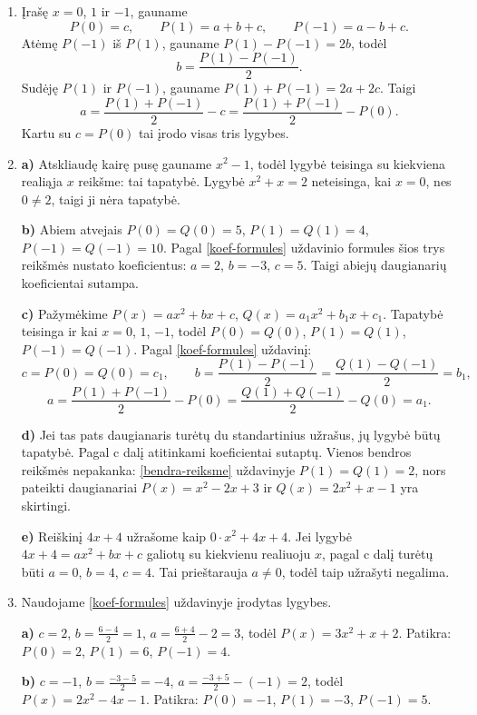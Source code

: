 \documentclass[12pt,a4paper]{exam}
\begin{document}
\begin{enumerate}
\textbf{b)} Įrašę $x=0$, gauname $P(0)=a\cdot0^2+b\cdot0+c=c$.

\textbf{c)} Kadangi $T(0)$ lygus laisvajam nariui, laisvasis narys yra $5$.

\textbf{d)} Pavyzdžiui, $x^2+5$ ir $2x^2+x+5$: jų laisvieji nariai lygūs $5$, o vyriausieji koeficientai nelygūs nuliui.
\item Įrašę $x=0$, $1$ ir $-1$, gauname
\[
P(0)=c,\qquad P(1)=a+b+c,\qquad P(-1)=a-b+c.
\]
Atėmę $P(-1)$ iš $P(1)$, gauname $P(1)-P(-1)=2b$, todėl
\[
b=\frac{P(1)-P(-1)}{2}.
\]
Sudėję $P(1)$ ir $P(-1)$, gauname $P(1)+P(-1)=2a+2c$. Taigi
\[
a=\frac{P(1)+P(-1)}{2}-c
 =\frac{P(1)+P(-1)}{2}-P(0).
\]
Kartu su $c=P(0)$ tai įrodo visas tris lygybes.
\item \textbf{a)} Atskliaudę kairę pusę gauname $x^2-1$, todėl lygybė teisinga su kiekviena realiąja $x$ reikšme: tai tapatybė. Lygybė $x^2+x=2$ neteisinga, kai $x=0$, nes $0\ne2$, taigi ji nėra tapatybė.

\textbf{b)} Abiem atvejais $P(0)=Q(0)=5$, $P(1)=Q(1)=4$, $P(-1)=Q(-1)=10$. Pagal \ref{koef-formules} uždavinio formules šios trys reikšmės nustato koeficientus: $a=2$, $b=-3$, $c=5$. Taigi abiejų daugianarių koeficientai sutampa.

\textbf{c)} Pažymėkime $P(x)=ax^2+bx+c$, $Q(x)=a_1x^2+b_1x+c_1$. Tapatybė teisinga ir kai $x=0$, $1$, $-1$, todėl $P(0)=Q(0)$, $P(1)=Q(1)$, $P(-1)=Q(-1)$. Pagal \ref{koef-formules} uždavinį:
\[c=P(0)=Q(0)=c_1,\qquad b=\frac{P(1)-P(-1)}{2}=\frac{Q(1)-Q(-1)}{2}=b_1,\]
\[a=\frac{P(1)+P(-1)}{2}-P(0)=\frac{Q(1)+Q(-1)}{2}-Q(0)=a_1.\]

\textbf{d)} Jei tas pats daugianaris turėtų du standartinius užrašus, jų lygybė būtų tapatybė. Pagal c dalį atitinkami koeficientai sutaptų. Vienos bendros reikšmės nepakanka: \ref{bendra-reiksme} uždavinyje $P(1)=Q(1)=2$, nors pateikti daugianariai $P(x)=x^2-2x+3$ ir $Q(x)=2x^2+x-1$ yra skirtingi.

\textbf{e)} Reiškinį $4x+4$ užrašome kaip $0\cdot x^2+4x+4$. Jei lygybė $4x+4=ax^2+bx+c$ galiotų su kiekvienu realiuoju $x$, pagal c dalį turėtų būti $a=0$, $b=4$, $c=4$. Tai prieštarauja $a\ne0$, todėl taip užrašyti negalima.
\item Naudojame \ref{koef-formules} uždavinyje įrodytas lygybes.

\textbf{a)} $c=2$, $b=\frac{6-4}{2}=1$, $a=\frac{6+4}{2}-2=3$, todėl $P(x)=3x^2+x+2$. Patikra: $P(0)=2$, $P(1)=6$, $P(-1)=4$.

\textbf{b)} $c=-1$, $b=\frac{-3-5}{2}=-4$, $a=\frac{-3+5}{2}-(-1)=2$, todėl $P(x)=2x^2-4x-1$. Patikra: $P(0)=-1$, $P(1)=-3$, $P(-1)=5$.


\end{enumerate}
\end{document}
